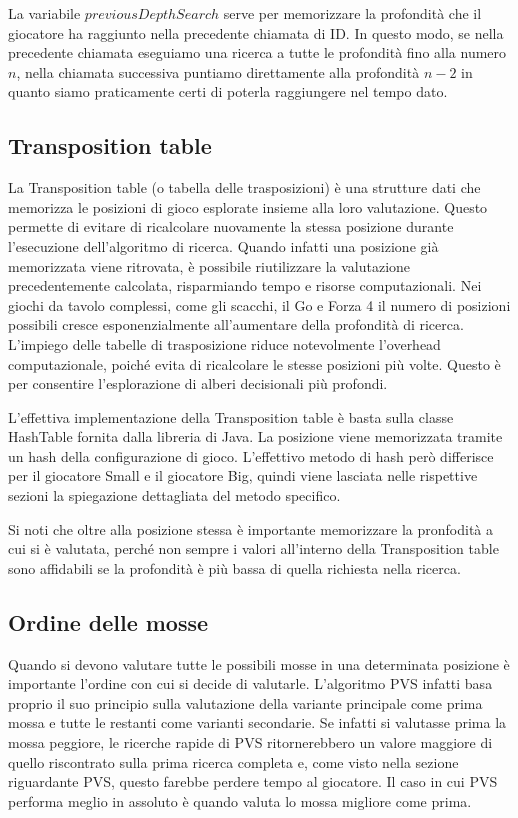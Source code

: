 \documentclass[a4paper]{article}
\begin{document}
La variabile $previousDepthSearch$ serve per memorizzare la profondità che il
giocatore ha raggiunto nella precedente chiamata di ID. In questo modo, se nella
precedente chiamata eseguiamo una ricerca a tutte le profondità fino alla numero 
$n$, nella chiamata successiva puntiamo direttamente alla profondità $n - 2$ in 
quanto siamo praticamente certi di poterla raggiungere nel tempo dato.


\subsection{Transposition table}
\label{sec_transpositionTable}
La Transposition table (o tabella delle trasposizioni) è una strutture dati 
che memorizza le posizioni di gioco esplorate insieme alla loro valutazione. 
Questo permette di evitare di ricalcolare nuovamente la stessa posizione durante 
l'esecuzione dell'algoritmo di ricerca. Quando infatti una posizione già 
memorizzata viene ritrovata, è possibile riutilizzare la valutazione 
precedentemente calcolata, risparmiando tempo e risorse computazionali.
Nei giochi da tavolo complessi, come gli scacchi, il Go e Forza 4 il numero di 
posizioni possibili cresce esponenzialmente all'aumentare della profondità di 
ricerca. L'impiego delle tabelle di trasposizione riduce notevolmente l'overhead 
computazionale, poiché evita di ricalcolare le stesse posizioni più volte. 
Questo è per consentire l'esplorazione di alberi decisionali più profondi.

L'effettiva implementazione della Transposition table è basta sulla classe
HashTable fornita dalla libreria di Java. La posizione viene memorizzata tramite
un hash della configurazione di gioco. L'effettivo metodo di hash però 
differisce per il giocatore Small e il giocatore Big, quindi viene lasciata 
nelle rispettive sezioni la spiegazione dettagliata del metodo specifico.

Si noti che oltre alla posizione stessa è importante memorizzare la pronfodità
a cui si è valutata, perché non sempre i valori all'interno della Transposition
table sono affidabili se la profondità è più bassa di quella richiesta nella
ricerca.

\subsection{Ordine delle mosse}
Quando si devono valutare tutte le possibili mosse in una determinata posizione
è importante l'ordine con cui si decide di valutarle. L'algoritmo PVS infatti 
basa proprio il suo principio sulla valutazione della variante principale come 
prima mossa e tutte le restanti come varianti secondarie. Se infatti si 
valutasse prima la mossa peggiore, le ricerche rapide di PVS ritornerebbero un
valore maggiore di quello riscontrato sulla prima ricerca completa e, come visto 
nella sezione riguardante PVS, questo farebbe perdere tempo al giocatore. Il 
caso in cui PVS performa meglio in assoluto è quando valuta lo mossa migliore 
come prima.
\end{document}
